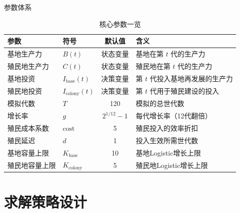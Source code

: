 \documentclass[aspectratio=169, 11pt]{beamer}
\begin{document}
\begin{frame}{参数体系}
  \begin{table}
    \centering
    \small
    \begin{tabular}{llcl}
      \toprule
      \textbf{参数} & \textbf{符号} & \textbf{默认值} & \textbf{含义} \\
      \midrule
      基地生产力 & $B(t)$ & 状态变量 & 基地在第 $t$ 代的生产力\\
      殖民地生产力 & $C(t)$ & 状态变量 & 殖民地在第 $t$ 代的生产力\\
      基地投资 & $I_{\text{base}}(t)$ & 决策变量 & 第 $t$ 代投入基地再发展的生产力\\
      殖民地投资 & $I_{\text{colony}}(t)$ & 决策变量 & 第 $t$ 代用于殖民建设的投入\\
      模拟代数       & $T$               & 120    & 模拟的总世代数 \\
      增长率         & $g$               & $2^{1/12}-1$ & 每代增长率（12代翻倍）\\
      殖民成本系数   & $\text{cost}$     & 5      & 殖民投入的效率折扣 \\
      殖民延迟       & $d$               & 1      & 投入生效所需世代数 \\
      基地容量上限   & $K_{\text{base}}$ & 10     & 基地Logistic增长上限 \\
      殖民地容量上限 & $K_{\text{colony}}$ & 5   & 殖民地Logistic增长上限 \\
      \bottomrule
    \end{tabular}
    \caption{核心参数一览}
  \end{table}

\end{frame}

\section{求解策略设计}
\end{document}
